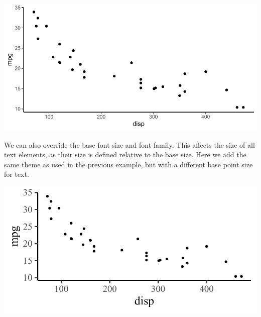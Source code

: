 \documentclass[krantz2]{krantz}\usepackage{knitr}
\begin{document}
\begin{knitrout}\footnotesize
{}\color{fgcolor}\begin{kframe}
\begin{alltt}
\hlstd{(} 
       \hlstd{(}    \hlopt{+}
  \hlstd{()} \hlopt{+}
  \hlstd{()}
\end{alltt}
\end{kframe}

{\centering \includegraphics[width=.7\textwidth]{figure/pos-ggplot-basics-09-1} 

}



\end{knitrout}

We can also override the base font size and font family. This affects the size of all text elements, as their size is defined relative to the base size. Here we add the same theme as used in the previous example, but with a different base point size for text.

\begin{knitrout}\footnotesize
{}\color{fgcolor}\begin{kframe}
\begin{alltt}
\hlstd{(} 
       \hlstd{(}    \hlopt{+}
  \hlstd{()} \hlopt{+}
  \hlstd{(} \hlstd{=} \hlstd{,}  \hlstd{=} \hlstd{)}
\end{alltt}
\end{kframe}

{\centering \includegraphics[width=.7\textwidth]{figure/pos-ggplot-basics-10-1} 

}



\end{knitrout}
\end{document}
